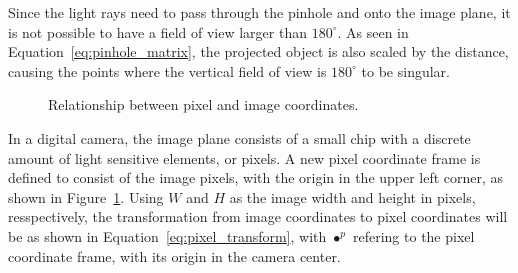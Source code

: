 Since the light rays need to pass through the pinhole and onto the image plane, it is not possible to have a field of view larger than $180^\circ$. As seen in Equation~\eqref{eq:pinhole_matrix}, the projected object is also scaled by the distance, causing the points where the vertical field of view is $180^\circ$ to be singular. 

\begin{figure}[!htb]
    \centering
    
    \caption{Relationship between pixel and image coordinates.}
    \label{fig:rel_img_pixel}
\end{figure}

In a digital camera, the image plane consists of a small chip with a discrete amount of light sensitive elements, or pixels. A new pixel coordinate frame is defined to consist of the image pixels, with the origin in the upper left corner, as shown in Figure~\ref{fig:rel_img_pixel}. Using $W$ and $H$ as the image width and height in pixels, resspectively, the transformation from image coordinates to pixel coordinates will be as shown in Equation~\eqref{eq:pixel_transform}, with $\bullet^p$ refering to the pixel coordinate frame, with its origin in the camera center.

